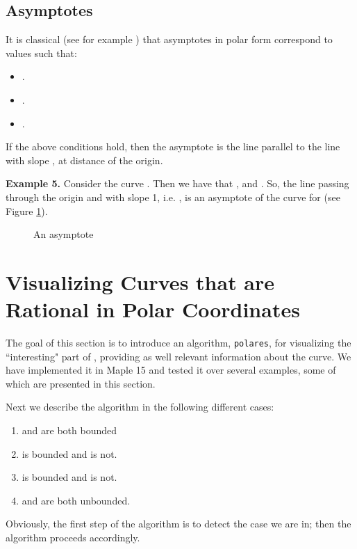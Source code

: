 \documentclass{elsart}
\begin{document}
\subsection{Asymptotes}\label{as}

It is classical (see for example \cite{DD}) that asymptotes in polar form correspond to values  such that:
\begin{itemize}
\item .
\item .
\item .
\end{itemize}
If the above conditions hold, then the asymptote is the line parallel to
the line with slope , at distance  of the origin.

{\bf Example 5.} Consider the curve . Then we have that ,  and . So, the line passing through
the origin and with slope 1, i.e. , is an asymptote of the curve for  (see Figure \ref{f8}).

\begin{figure}[ht]
\begin{center}
\centerline{  }
\end{center}
\caption{An asymptote}\label{f8}
\end{figure}

\section{Visualizing Curves that are Rational in Polar Coordinates}

The goal of this section is to introduce an algorithm,  {\tt polares},  for visualizing the ``interesting" part of  , providing as well relevant information about the curve. We have implemented it in Maple 15 and tested it over several examples, some of which are presented in this section.

Next we describe the algorithm in the following different cases:
\begin{enumerate}
  \item  and  are both bounded
  \item  is bounded and  is not.
  \item   is bounded and  is not.
  \item   and  are both unbounded.
\end{enumerate}

Obviously, the first step of the algorithm is to detect the case we are in; then the algorithm proceeds accordingly.
\end{document}
